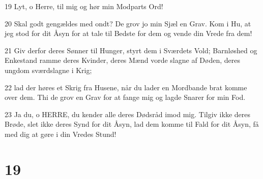 \par 19 Lyt, o Herre, til mig og hør min Modparts Ord!
\par 20 Skal godt gengældes med ondt? De grov jo min Sjæl en Grav. Kom i Hu, at jeg stod for dit Åsyn for at tale til Bedste for dem og vende din Vrede fra dem!
\par 21 Giv derfor deres Sønner til Hunger, styrt dem i Sværdets Vold; Barnløshed og Enkestand ramme deres Kvinder, deres Mænd vorde slagne af Døden, deres ungdom sværdslagne i Krig;
\par 22 lad der høres et Skrig fra Husene, når du lader en Mordbande brat komme over dem. Thi de grov en Grav for at fange mig og lagde Snarer for min Fod.
\par 23 Ja du, o HERRE, du kender alle deres Dødsråd imod mig. Tilgiv ikke deres Brøde, slet ikke deres Synd for dit Åsyn, lad dem komme til Fald for dit Åsyn, få med dig at gøre i din Vredes Stund!

\chapter{19}

